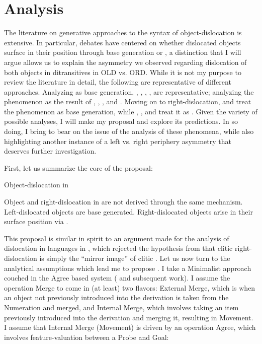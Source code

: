 \documentclass[output=paper,newtxmath,modfonts,nonflat,hidelinks]{langsci/langscibook}
\begin{document}
\section{Analysis}\label{sec:ranero:4}
\largerpage 
The literature on generative approaches to the syntax of object-dislocation is extensive. In particular, debates have centered on whether dislocated objects surface in their position through base generation or , a distinction that I will argue allows us to explain the asymmetry we observed regarding dislocation of both objects in ditransitives in OLD vs. ORD. While it is not my purpose to review the literature in detail, the following are representative of different approaches. Analyzing  as base generation, \citet{Cinque1990}, \citet{iatridou1995}, \citet{Anagnostopoulou1994}, \citet{Suñer2006}, \citet{De2007} are representative; analyzing the phenomenon as the result of , \citet{kayne1994}, \citet{Zubizarreta1998}, and \citet{zeller2009}. Moving on to right-dislocation, \citet{kayne1994} and \citet{Cardinaletti2002} treat the phenomenon as base generation, while \citet{Kayne1995}, \citet{Cecchetto1999}, \citet{Zeller2015} and \citet{Samek-Lodovici2016} treat it as . Given the variety of possible analyses, I will make my proposal and explore its predictions. In so doing, I bring  to bear on the issue of the analysis of these phenomena, while also highlighting another instance of a left vs. right periphery asymmetry that deserves further investigation.

First, let us summarize the core of the proposal:

\ea\label{ex:ranero:28}
Object-dislocation in  

\ea\label{ex:ranero:28a}
Object  and right-dislocation in  are not derived through the same mechanism.
\ex\label{ex:ranero:28b}
Left-dislocated objects are base generated.
\ex\label{ex:ranero:28c}
Right-dislocated objects arise in their surface position via .
\z
\z

This proposal is similar in spirit to an argument made for the analysis of dislocation in  languages in \citet{Cecchetto1999}, which rejected the hypothesis from \citet{Vallduví1992} that clitic right-dislocation is simply the “mirror image” of clitic . Let us now turn to the analytical assumptions which lead me to propose . I take a Minimalist approach couched in the Agree based system (\citealt{Chomsky2000} and subsequent work). I assume the operation Merge to come in (at least) two flavors: External Merge, which is when an object not previously introduced into the derivation is taken from the Numeration and merged, and Internal Merge, which involves taking an item previously introduced into the derivation and merging it, resulting in Movement. I assume that Internal Merge (Movement) is driven by an operation Agree, which involves feature-valuation between a Probe and Goal:
\end{document}
